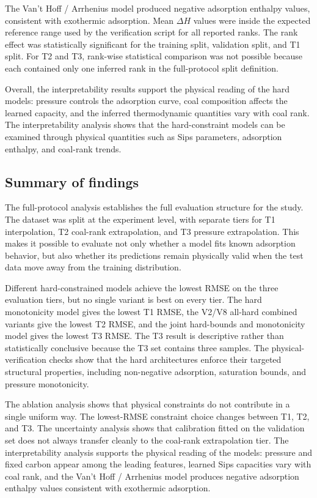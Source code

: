 \documentclass[11pt]{article}
\begin{document}
The Van't Hoff / Arrhenius model produced negative adsorption enthalpy values,
consistent with exothermic adsorption. Mean \(\Delta H\) values were inside the expected
reference range used by the verification script for all reported ranks. The
rank effect was statistically significant for the training split, validation
split, and T1 split. For T2 and T3, rank-wise statistical comparison was not
possible because each contained only one inferred rank in the full-protocol split
definition.

Overall, the interpretability results support the physical reading of the hard
models: pressure controls the adsorption curve, coal composition affects the
learned capacity, and the inferred thermodynamic quantities vary with coal
rank. The interpretability analysis shows that the hard-constraint models can
be examined through physical quantities such as Sips parameters,
adsorption enthalpy, and coal-rank trends.

\subsection{Summary of findings}

The full-protocol analysis establishes the full evaluation structure for the study.
The dataset was split at the experiment level, with separate tiers for
T1 interpolation, T2 coal-rank extrapolation, and T3 pressure extrapolation.
This makes it possible to evaluate not only whether a model fits known
adsorption behavior, but also whether its predictions remain physically valid
when the test data move away from the training distribution.

Different hard-constrained models achieve the lowest RMSE on the three
evaluation tiers, but no single variant is best on every tier. The hard
monotonicity model gives the lowest T1 RMSE, the V2/V8 all-hard combined
variants give the lowest T2 RMSE, and the joint hard-bounds and monotonicity
model gives the lowest T3 RMSE. The
T3 result is descriptive rather than statistically conclusive because the T3 set
contains three samples. The
physical-verification checks show that the hard architectures enforce their
targeted structural properties, including non-negative adsorption, saturation
bounds, and pressure monotonicity.

The ablation analysis shows that physical constraints do not contribute in a
single uniform way. The lowest-RMSE constraint choice changes between T1, T2,
and T3. The uncertainty analysis shows that
calibration fitted on the validation set does not always transfer cleanly to
the coal-rank extrapolation tier. The interpretability analysis supports the
physical reading of the models: pressure and fixed carbon appear among the
leading features, learned Sips capacities vary with coal rank, and the
Van't Hoff / Arrhenius model
produces negative adsorption enthalpy values consistent with exothermic
adsorption.
\end{document}

